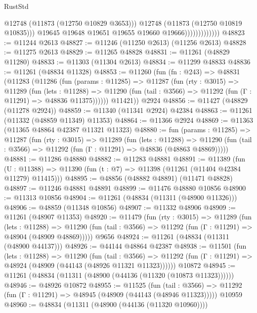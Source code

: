 \begin{lexlean}{RustStd}
\begin{coremodule}
                                  @12748
                                  (@11873 (@12750 @10829 @3653)))
                                @12748
                                (@11873 (@12750 @10819 @10835)))
                              @19645
                              @19648
                              @19651
                              @19655
                              @19660
                              @19666)))))))))))))
@48823 := @11244 @2613
@48827 := @11246 (@11250 @2613) (@11256 @2613)
@48828 := @11275 @2613
@48829 := @11265 @48828
@48831 := @11261 (@48829 @11280)
@48833 := @11303 (@11304 @2613)
@48834 := @11299 @48833
@48836 := @11261 (@48834 @11328)
@48853 := @11260
    (fun (fn : @243) =>
    @48831
      (@11283
        (@11286
          (fun (params : @11285) =>
          @11287
            (fun (rty : @3015) =>
            @11289
              (fun (lets : @11288) =>
              @11290 (fun (tail : @3566) => @11292 (fun (Γ : @11291) => @48836 @11375))))))
        @11421))
    @2924
@48856 := @11427 (@48829 (@11278 @2924))
@48859 := @11340 (@11341 @2924) @42384
@48863 := @11261 (@11332 (@48859 @11349) @11353)
@48864 := @11366 @2924
@48869 := @11363 (@11365 @48864 @42387 @11321 @11323)
@48880 := fun (params : @11285) =>
  @11287
    (fun (rty : @3015) =>
    @11289
      (fun (lets : @11288) =>
      @11290 (fun (tail : @3566) => @11292 (fun (Γ : @11291) => @48836 (@48863 @48869)))))
@48881 := @11286 @48880
@48882 := @11283 @48881
@48891 := @11389
    (fun (U : @11388) => @11390 (fun (t : @7) => @11398 (@11261 (@11404 @42384 @11279) @11415)))
@48895 := @48856 (@48882 @48891) (@11471 @48828)
@48897 := @11246 @48881 @48891
@48899 := @11476 @48880 @10856
@48900 := @11313 @10856
@48904 := @11261 (@48834 (@11311 (@48900 @11326)))
@48906 := @48859 (@11348 @10856)
@48907 := @11332 @48906
@48909 := @11261 (@48907 @11353)
@48920 := @11479
    (fun (rty : @3015) =>
    @11289
      (fun (lets : @11288) =>
      @11290 (fun (tail : @3566) => @11292 (fun (Γ : @11291) => @48904 (@48909 @48869)))))
    @9656
@48924 := @11261 (@48834 (@11311 (@48900 @44137)))
@48926 := @44144 @48864 @42387
@48938 := @11501
    (fun (lets : @11288) =>
    @11290
      (fun (tail : @3566) =>
      @11292 (fun (Γ : @11291) => @48924 (@48909 (@44143 (@48926 @11321 @11323))))))
    @10872
@48945 := @11261 (@48834 (@11311 (@48900 (@44136 (@11320 (@10873 @11323))))))
@48946 := @48926 @10872
@48955 := @11525
    (fun (tail : @3566) => @11292 (fun (Γ : @11291) => @48945 (@48909 (@44143 (@48946 @11323)))))
    @10959
@48960 := @48834 (@11311 (@48900 (@44136 (@11320 @10960))))

\end{coremodule}
\end{lexlean}
